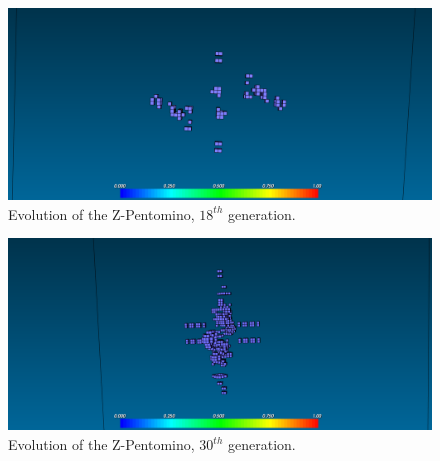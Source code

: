\begin{figure}[H]
	\centering
	\includegraphics[scale=0.3]{pentominoes_ss/z_18.png}
	\caption{Evolution of the Z-Pentomino, $18^{th}$ generation.}
	\label{fig:ss-pent:z-18}
\end{figure}

\begin{figure}[H]
	\centering
	\includegraphics[scale=0.3]{pentominoes_ss/z_30.png}
	\caption{Evolution of the Z-Pentomino, $30^{th}$ generation.}
	\label{fig:ss-pent:z-30}
\end{figure}

